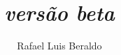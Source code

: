 \documentclass[oneside,openany,a4paper,titlepage]{book}
\author{Rafael Luis Beraldo}
\title{
	{\Huge \caps{O (Pequeno) Manual de \LaTeX{} do Linguista Contempor\^aneo}
				{\small \emph{versão beta}}
	} \\
}
\begin{document}
\maketitle
\tableofcontents
\newpage
%








\printglossaries

\end{document}
